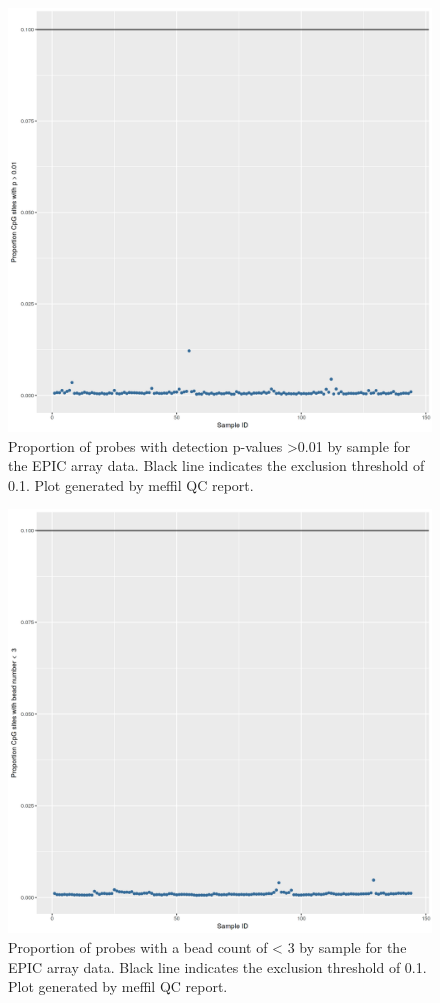 \documentclass[]{book}
\begin{document}
\begin{figure}

{\centering \includegraphics[width=0.8\linewidth]{figs/MAVIDOSqcEPICpropSites} 

}

\caption{Proportion of probes with detection p-values \textgreater0.01 by sample for the EPIC array data. Black line indicates the exclusion threshold of 0.1. Plot generated by meffil QC report.}\label{fig:MAVIDOSqcEPICpropSites}
\end{figure}



\begin{figure}

{\centering \includegraphics[width=0.8\linewidth]{figs/MAVIDOSqcEPICbeadNum} 

}

\caption{Proportion of probes with a bead count of \textless{} 3 by sample for the EPIC array data. Black line indicates the exclusion threshold of 0.1. Plot generated by meffil QC report.}\label{fig:MAVIDOSqcEPICbeadNum}
\end{figure}
\end{document}
